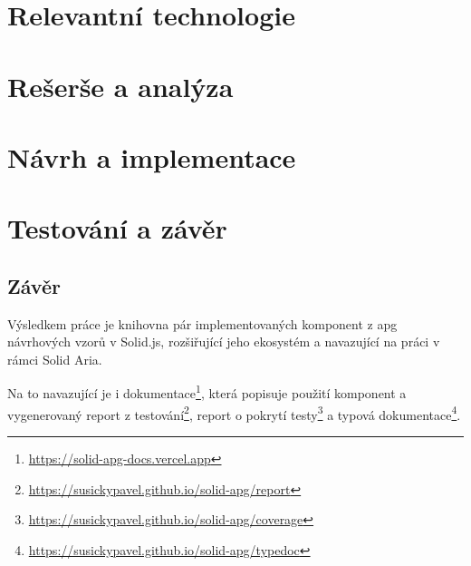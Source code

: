 \documentclass{ctuthesis}
\begin{document}

\maketitle



\part{Relevantní technologie}




\part{Rešerše a analýza}




\part{Návrh a implementace}




\part{Testování a závěr}



\chapter{Závěr}

Výsledkem práce je knihovna pár implementovaných komponent z \gls{apg} návrhových vzorů v Solid.js, rozšiřující jeho ekosystém a navazující na práci v rámci Solid Aria.

Na to navazující je i dokumentace\footnote{\url{https://solid-apg-docs.vercel.app}}, která popisuje použití komponent a vygenerovaný report z testování\footnote{\url{https://susickypavel.github.io/solid-apg/report}}, report o pokrytí testy\footnote{\url{https://susickypavel.github.io/solid-apg/coverage}} a typová dokumentace\footnote{\url{https://susickypavel.github.io/solid-apg/typedoc}}.
\end{document}
